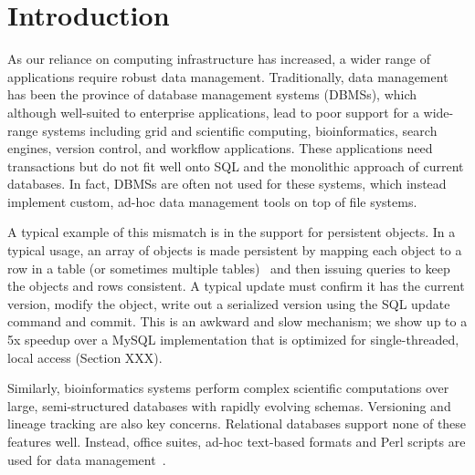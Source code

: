 \documentclass[letterpaper,twocolumn,10pt]{article}
\begin{document}




\section{Introduction}

As our reliance on computing infrastructure has increased, a wider range of 
applications require robust data management.  Traditionally, data management
has been the province of database management systems (DBMSs), which although
well-suited to enterprise applications, lead to poor support for a
wide-range systems including grid and scientific computing,
bioinformatics, search engines, version control, and workflow
applications.  These applications need transactions but do not fit well
onto SQL and the monolithic approach of current databases.  In
fact, DBMSs are often not used for these systems, which instead
implement custom, ad-hoc data management tools on top of file
systems.

A typical example of this mismatch is in the support for
persistent objects.
In a typical usage, an array of objects is made persistent by
mapping each object to a row in a table (or sometimes multiple
tables)~\cite{hibernate} and then issuing queries to keep the objects and
rows consistent. A typical update must confirm it has the current
version, modify the object, write out a serialized version using the
SQL update command and commit. This is an awkward and slow mechanism;
we show up to a 5x speedup over a MySQL implementation that is
optimized for single-threaded, local access (Section XXX).

Similarly, bioinformatics systems perform complex scientific
computations over large, semi-structured databases with rapidly evolving schemas.  Versioning and
lineage tracking are also key concerns.  Relational databases support
none of these features well.  Instead, office suites, ad-hoc
text-based formats and Perl scripts are used for data management~\cite{perl, excel}.
\end{document}
